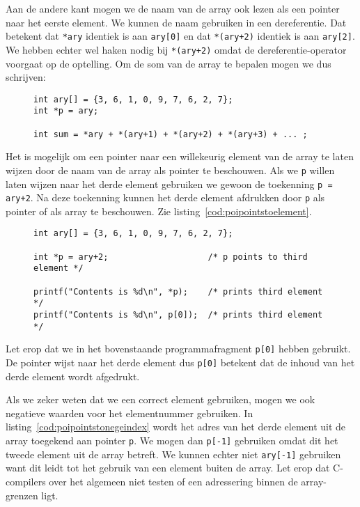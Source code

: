 Aan de andere kant mogen we de naam van de array ook lezen als een pointer naar het eerste element. We kunnen de naam gebruiken in een dereferentie. Dat betekent dat \texttt{*ary} identiek is aan \texttt{ary[0]} en dat \texttt{*(ary+2)} identiek is aan \texttt{ary[2]}. We hebben echter wel haken nodig bij \texttt{*(ary+2)} omdat de dereferentie-operator voorgaat op de optelling. Om de som van de array te bepalen mogen we dus schrijven:

\begin{figure}[!ht]
\begin{lstlisting}[caption=Bepalen van de som van elementen in een array.,label=cod:poiarrayandpointersym2]
int ary[] = {3, 6, 1, 0, 9, 7, 6, 2, 7};
int *p = ary;

int sum = *ary + *(ary+1) + *(ary+2) + *(ary+3) + ... ;
\end{lstlisting}
\end{figure}

Het is mogelijk om een pointer naar een willekeurig element van de array te laten wijzen door de naam van de array als pointer te beschouwen. Als we \texttt{p} willen laten wijzen naar het derde element gebruiken we gewoon de toekenning \texttt{p = ary+2}. Na deze toekenning kunnen het derde element afdrukken door \texttt{p} als pointer of als array te beschouwen. Zie listing~\ref{cod:poipointstoelement}.

\begin{figure}[!ht]
\begin{lstlisting}[caption=Pointer die naar een element in een array wijst.,label=cod:poipointstoelement]
int ary[] = {3, 6, 1, 0, 9, 7, 6, 2, 7};

int *p = ary+2;                    /* p points to third element */

printf("Contents is %d\n", *p);    /* prints third element */
printf("Contents is %d\n", p[0]);  /* prints third element */
\end{lstlisting}
\end{figure}

Let erop dat we in het bovenstaande programmafragment \texttt{p[0]} hebben gebruikt. De pointer wijst naar het derde element dus \texttt{p[0]} betekent dat de inhoud van het derde element wordt afgedrukt.

Als we zeker weten dat we een correct element gebruiken, mogen we ook negatieve waarden voor het elementnummer gebruiken. In listing~\ref{cod:poipointstonegeindex} wordt het adres van het derde element uit de array toegekend aan pointer \texttt{p}. We mogen dan \texttt{p[-1]} gebruiken omdat dit het tweede element uit de array betreft. We kunnen echter niet \texttt{ary[-1]} gebruiken want dit leidt tot het gebruik van een element buiten de array. Let erop dat C-compilers over het algemeen niet testen of een adressering binnen de array-grenzen ligt.

